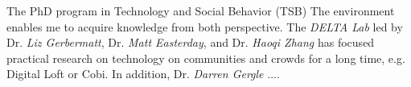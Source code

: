The PhD program in Technology and Social Behavior (TSB) 
The environment enables me to acquire knowledge from both perspective.
The \emph{DELTA Lab} led by Dr. \emph{Liz Gerbermatt}, Dr. \emph{Matt Easterday}, and Dr. \emph{Haoqi Zhang}
has focused practical research on technology on communities and crowds for a long time, e.g. Digital Loft or Cobi. 
In addition, Dr. \emph{Darren Gergle} .... 














